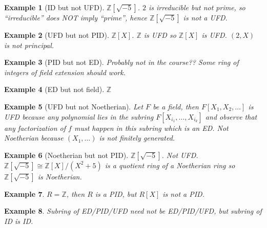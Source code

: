 \documentclass{article}
\theoremstyle{definition}
\theoremstyle{remark}
\theoremstyle{plain}
\newtheorem{example}{Example}
\theoremstyle{definition}
\newcommand{\ZZ}{\mathbb{Z}}
\begin{document}
\begin{example}[ID but not UFD]
    $\ZZ[\sqrt{-5}]$. $2$ is irreducible but not prime, so ``irreducible'' does NOT imply ``prime'', hence $\ZZ[\sqrt{-5}]$ is not a UFD.
\end{example}
\begin{example}[UFD but not PID]
    $\ZZ[X]$. $\ZZ$ is UFD so $\ZZ[X]$ is UFD. $(2,X)$ is not principal.
\end{example}
\begin{example}[PID but not ED]
    Probably not in the course?? Some ring of integers of field extension should work.
\end{example}
\begin{example}[ED but not field]
    $\ZZ$
\end{example}
\begin{example}[UFD but not Noetherian]
    Let $F$ be a field, then $F[X_1,X_2,\ldots]$ is UFD because any polynomial lies in the subring $F[X_{i_1},\ldots, X_{i_k}]$ and observe that any factorization of $f$ must happen in this subring which is an ED. Not Noetherian because $(X_1,\ldots)$ is not finitely generated.
\end{example}
\begin{example}[Noetherian but not PID]
    $\ZZ[\sqrt{-5}]$. Not UFD. $\ZZ[\sqrt{-5}]\cong \ZZ[X]/(X^2+5)$ is a quotient ring of a Noetherian ring so $\ZZ[\sqrt{-5}]$ is Noetherian.
\end{example}
\begin{example}
    $R=\ZZ$, then $R$ is a PID, but $R[X]$ is not a PID.
\end{example}
\begin{example}
    Subring of ED/PID/UFD need not be ED/PID/UFD, but subring of ID is ID.
\end{example}
\end{document}
